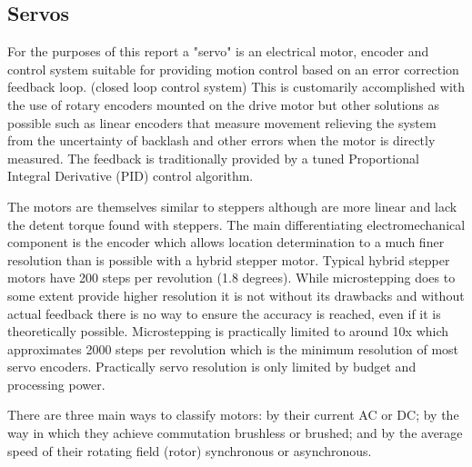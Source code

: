 \documentclass{article}
\begin{document}

\subsection{Servos}

For the purposes of this report a "servo" is an electrical motor, encoder and control system suitable for providing motion control based on an error correction feedback loop. (closed loop control system) This is customarily accomplished with the use of rotary encoders mounted on the drive motor but other solutions as possible such as linear encoders that measure movement relieving the system from the uncertainty of backlash and other errors when the motor is directly measured. The feedback is traditionally provided by a tuned Proportional Integral Derivative (PID) control algorithm.
\par
The motors are themselves similar to steppers although are more linear and lack the detent torque found with steppers. The main differentiating electromechanical component is the encoder which allows location determination to a much finer resolution than is possible with a hybrid stepper motor. Typical hybrid stepper motors have 200 steps per revolution (1.8 degrees). While microstepping does to some extent provide higher resolution it is not without its drawbacks and without actual feedback there is no way to ensure the accuracy is reached, even if it is theoretically possible. Microstepping is practically limited to around 10x which approximates 2000 steps per revolution which is the minimum resolution of most servo encoders. Practically servo resolution is only limited by budget and processing power. 
\par
There are three main ways to classify motors: by their current AC or DC; by the way in which they achieve commutation brushless or brushed; and by the average speed of their rotating field (rotor) synchronous or asynchronous.
\end{document}
